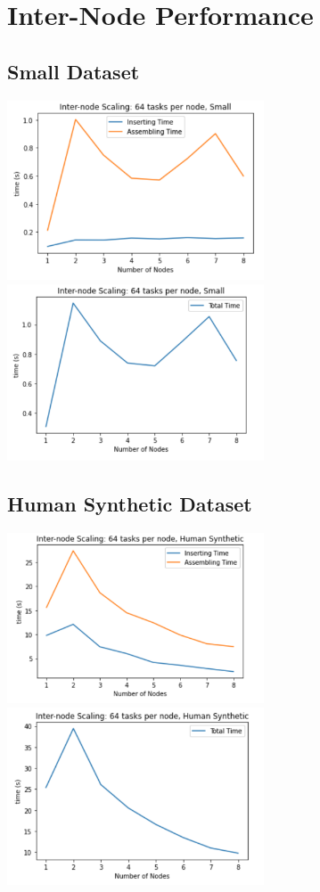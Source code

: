 \documentclass{article}
\begin{document}
\section{Inter-Node Performance}
\subsection{Small Dataset}
\centerline{\includegraphics[width=3in]{figures/inter-small-prof.png}\includegraphics[width=3in]{figures/inter-small.png}}
\subsection{Human Synthetic Dataset}
\centerline{\includegraphics[width=3in]{figures/inter-human-prof.png}\includegraphics[width=3in]{figures/inter-human.png}}
\end{document}
